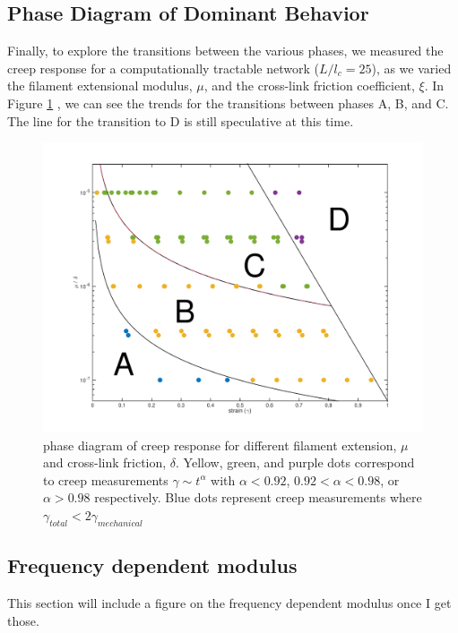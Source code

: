 \documentclass[pre,preprint]{revtex4-1}
\begin{document}
\subsection{Phase Diagram of Dominant Behavior}
Finally, to explore the transitions between the various phases, we measured the creep response for a computationally tractable network ($L/l_c = 25$), as we varied the filament extensional modulus, $\mu$, and the cross-link friction coefficient, $\xi$.  In Figure \ref{fig:phase_diag} , we can see the trends for the transitions between phases A, B, and C.  The line for the transition to D is still speculative at this time.

\begin{figure}[h!]
\centering
\includegraphics[width=\hsize]{phase_diag}
\caption{\label{fig:phase_diag} phase diagram of creep response for different filament extension, $\mu$ and cross-link friction, $\delta$.  Yellow, green, and purple dots correspond to creep measurements $\gamma \sim t^\alpha$ with $\alpha<0.92$, $0.92<\alpha<0.98$, or $\alpha>0.98$ respectively.  Blue dots represent creep measurements where $\gamma_{total} < 2\gamma_{mechanical}$}
\end{figure}


\subsection{Frequency dependent modulus}
This section will include a figure on the frequency dependent modulus once I get those.
\end{document}
